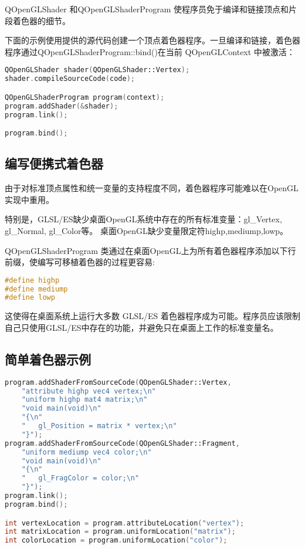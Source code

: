 QOpenGLShader 和QOpenGLShaderProgram 使程序员免于编译和链接顶点和片段着色器的细节。

下面的示例使用提供的源代码创建一个顶点着色器程序。一旦编译和链接，着色器程序通过QOpenGLShaderProgram::bind()在当前 QOpenGLContext 中被激活：


\begin{lstlisting}[language=C++]
QOpenGLShader shader(QOpenGLShader::Vertex);
shader.compileSourceCode(code);

QOpenGLShaderProgram program(context);
program.addShader(&shader);
program.link();

program.bind();
\end{lstlisting}


\subsection{编写便携式着色器}

由于对标准顶点属性和统一变量的支持程度不同，着色器程序可能难以在OpenGL实现中重用。

特别是，GLSL/ES缺少桌面OpenGL系统中存在的所有标准变量：gl\_Vertex, gl\_Normal, gl\_Color等。
桌面OpenGL缺少变量限定符highp,mediump,lowp。

QOpenGLShaderProgram 类通过在桌面OpenGL上为所有着色器程序添加以下行前缀，使编写可移植着色器的过程更容易:

\begin{lstlisting}[language=C++]
#define highp
#define mediump
#define lowp
\end{lstlisting}

这使得在桌面系统上运行大多数 GLSL/ES 着色器程序成为可能。程序员应该限制自己只使用GLSL/ES中存在的功能，并避免只在桌面上工作的标准变量名。

\subsection{简单着色器示例}

\begin{lstlisting}[language=C++]
    program.addShaderFromSourceCode(QOpenGLShader::Vertex,
    "attribute highp vec4 vertex;\n"
    "uniform highp mat4 matrix;\n"
    "void main(void)\n"
    "{\n"
    "   gl_Position = matrix * vertex;\n"
    "}");
program.addShaderFromSourceCode(QOpenGLShader::Fragment,
    "uniform mediump vec4 color;\n"
    "void main(void)\n"
    "{\n"
    "   gl_FragColor = color;\n"
    "}");
program.link();
program.bind();

int vertexLocation = program.attributeLocation("vertex");
int matrixLocation = program.uniformLocation("matrix");
int colorLocation = program.uniformLocation("color");
\end{lstlisting}

